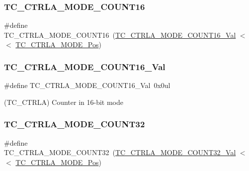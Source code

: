 \subsubsection{\texorpdfstring{TC\_CTRLA\_MODE\_COUNT16}{TC\_CTRLA\_MODE\_COUNT16}}
{\footnotesize\ttfamily \#define T\+C\+\_\+\+C\+T\+R\+L\+A\+\_\+\+M\+O\+D\+E\+\_\+\+C\+O\+U\+N\+T16~(\mbox{\hyperlink{group___s_a_m_d21___t_c_gacf36c4f8dfa9af8b7d0b8103ded6df59}{T\+C\+\_\+\+C\+T\+R\+L\+A\+\_\+\+M\+O\+D\+E\+\_\+\+C\+O\+U\+N\+T16\+\_\+\+Val}}     $<$$<$ \mbox{\hyperlink{group___s_a_m_d21___t_c_gaae33620c144befdc20a57898c2d5bb96}{T\+C\+\_\+\+C\+T\+R\+L\+A\+\_\+\+M\+O\+D\+E\+\_\+\+Pos}})}

\mbox{\label{group___s_a_m_d21___t_c_gacf36c4f8dfa9af8b7d0b8103ded6df59}} 
\subsubsection{\texorpdfstring{TC\_CTRLA\_MODE\_COUNT16\_Val}{TC\_CTRLA\_MODE\_COUNT16\_Val}}
{\footnotesize\ttfamily \#define T\+C\+\_\+\+C\+T\+R\+L\+A\+\_\+\+M\+O\+D\+E\+\_\+\+C\+O\+U\+N\+T16\+\_\+\+Val~0x0ul}



(T\+C\+\_\+\+C\+T\+R\+LA) Counter in 16-\/bit mode 

\mbox{\label{group___s_a_m_d21___t_c_gaafd0a2639ddfff12e2d493182da59b8c}} 
\subsubsection{\texorpdfstring{TC\_CTRLA\_MODE\_COUNT32}{TC\_CTRLA\_MODE\_COUNT32}}
{\footnotesize\ttfamily \#define T\+C\+\_\+\+C\+T\+R\+L\+A\+\_\+\+M\+O\+D\+E\+\_\+\+C\+O\+U\+N\+T32~(\mbox{\hyperlink{group___s_a_m_d21___t_c_gac7e348d6c5100444a6b538d20b420c8c}{T\+C\+\_\+\+C\+T\+R\+L\+A\+\_\+\+M\+O\+D\+E\+\_\+\+C\+O\+U\+N\+T32\+\_\+\+Val}}     $<$$<$ \mbox{\hyperlink{group___s_a_m_d21___t_c_gaae33620c144befdc20a57898c2d5bb96}{T\+C\+\_\+\+C\+T\+R\+L\+A\+\_\+\+M\+O\+D\+E\+\_\+\+Pos}})}

